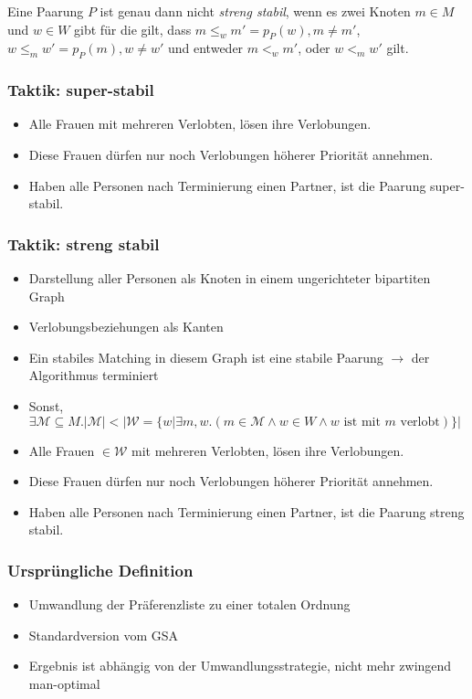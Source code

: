 \begin{frame}
  \begin{Definition}
  \label{streng_stabil}
    Eine Paarung $P$ ist genau dann nicht \textit{streng stabil}, wenn es zwei Knoten $m \in M$ und $w \in W$ gibt für die gilt, dass $m \leq_{w} m' = p_{P}(w), m \neq m'$, $w \leq_{m} w' = p_{P}(m), w \neq w'$ und entweder $m <_{w} m'$, oder $w <_{m} w'$ gilt.
  \end{Definition}
\end{frame}

\begin{frame}
\end{frame}

\begin{frame}
  \frametitle{Taktik: super-stabil}
  \begin{itemize}[<+->]
    \item Alle Frauen mit mehreren Verlobten, lösen ihre Verlobungen.
    \item Diese Frauen dürfen nur noch Verlobungen höherer Priorität annehmen.
    \item Haben alle Personen nach Terminierung einen Partner, ist die Paarung super-stabil.
  \end{itemize}
\end{frame}

\begin{frame}
  \frametitle{Taktik: streng stabil}
  \begin{itemize}[<+->]
    \item Darstellung aller Personen als Knoten in einem ungerichteter bipartiten Graph
    \item Verlobungsbeziehungen als Kanten
    \item Ein stabiles Matching in diesem Graph ist eine stabile Paarung $\longrightarrow$ der Algorithmus terminiert
    \item Sonst, $\exists \mathcal{M} \subseteq M. |\mathcal{M}| < |\mathcal{W} = \{w | \exists m, w.(m \in \mathcal{M} \land w \in W \land  w \textrm{ ist mit } m \textrm{ verlobt})\}|$
    \item Alle Frauen $\in \mathcal{W}$ mit mehreren Verlobten, lösen ihre Verlobungen.
    \item Diese Frauen dürfen nur noch Verlobungen höherer Priorität annehmen.
    \item Haben alle Personen nach Terminierung einen Partner, ist die Paarung streng stabil.
  \end{itemize}
\end{frame}

\begin{frame}
  \frametitle{Ursprüngliche Definition}
  \begin{itemize}[<+->]
    \item Umwandlung der Präferenzliste zu einer totalen Ordnung
    \item Standardversion vom GSA
    \item Ergebnis ist abhängig von der Umwandlungsstrategie, nicht mehr zwingend man-optimal
  \end{itemize}
\end{frame}
